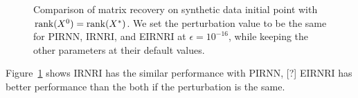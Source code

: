 \documentclass[twoside,11pt]{article}
\numberwithin{equation}{section}
\begin{document}
 \begin{figure}[H]
\captionsetup{singlelinecheck=off, justification=raggedright}
\caption{Comparison of matrix recovery on synthetic data initial point with ${\rm rank}(X^{0}) = {\rm rank}(X^{*})$. We set the perturbation value to be the same for PIRNN, IRNRI, and EIRNRI at $\epsilon = 10^{-16}$, while keeping the other parameters at their default values.
}
\label{fig_LLrate}
\end{figure}

Figure~\ref{fig_LLrate} shows IRNRI has the similar performance with PIRNN, [?]
EIRNRI has better performance than the both if the perturbation is the same.
\end{document}
